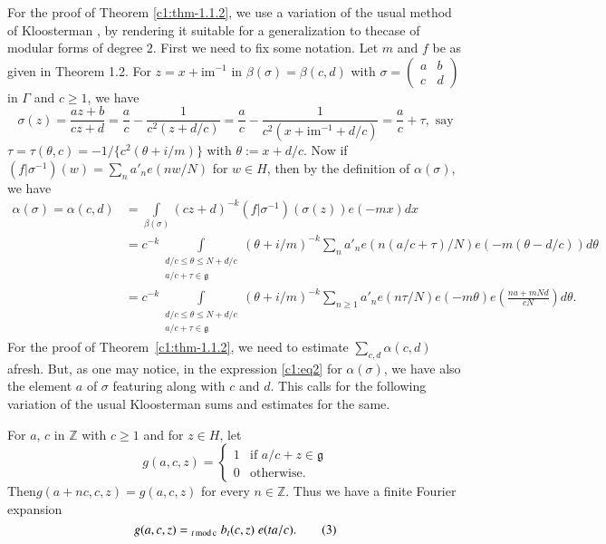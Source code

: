 For the proof of Theorem \ref{c1:thm-1.1.2}, we use a variation of the
usual method of Kloosterman \cite{key14}, by rendering it suitable for a
generalization to the\pageoriginale case of modular forms of degree
$2$. First we need to fix some notation. Let $m$ and $f$ be as given
in Theorem 1.2. For $z=x+\text{im}^{-1}$ in
$\beta(\sigma)=\beta(c,d)$ with $\sigma=\left(\begin{smallmatrix} a &
  b\\ c & d\end{smallmatrix}\right)$ in $\Gamma$ and $c\geq 1$, we
  have
$$
\sigma(z)=\frac{az+b}{cz+d}=\frac{a}{c}-\frac{1}{c^{2}(z+d/c)}=\frac{a}{c}-\frac{1}{c^{2}(x+\text{im}^{-1}+d/c)}=\frac{a}{c}+\tau,
\text{ \ say}
$$
$\tau=\tau(\theta,c)=-1/\{c^{2}(\theta+i/m)\}$ with
$\theta:=x+d/c$. Now if
$(f|\sigma^{-1})(w)=\sum\limits_{n}a'_{n}e(nw/N)$ for $w\in H$, then
by the definition of $\alpha(\sigma)$, we have
{\fontsize{9}{11}\selectfont
\begin{align*}
\alpha(\sigma)=\alpha(c,d) &=
\int\limits_{\beta(\sigma)}(cz+d)^{-k}(f|\sigma^{-1})(\sigma(z))e(-mx)dx\\
&= c^{-k}\int\limits_{\substack{d/c\leq \theta \leq
    N+d/c\\ a/c+\tau\in\mathfrak{g}}}(\theta+i/m)^{-k}\sum_{n}a'_{n}e(n(a/c+\tau)/N)e(-m(\theta-d/c))d\theta\\
&= c^{-k}\int\limits_{\substack{d/c\leq \theta\leq N+d/c\\ a/c+\tau\in
  \mathfrak{g}}}(\theta+i/m)^{-k}\sum_{n\geq 1}a'_{n}e(n\tau/N)e(-m\theta)e
\left(\frac{na+mNd}{cN}\right)d\theta.\tag{2}\label{c1:eq2}
\end{align*}}\relax
For the proof of Theorem~\ref{c1:thm-1.1.2}, we need to estimate
$\sum\limits_{c,d}\alpha(c,d)$ afresh. But, as one may notice, in the
expression \eqref{c1:eq2} for $\alpha(\sigma)$, we have also the element
$a$ of $\sigma$ featuring along with $c$ and $d$. This calls for the
following variation of the usual Kloosterman sums and estimates for
the same.

For $a$, $c$ in $\mathbb{Z}$ with $c\geq 1$ and for $z\in H$, let
$$
g(a,c,z)=
\begin{cases}
1 & \text{if \ } a/c+z\in\mathfrak{g}\\
0 & \text{otherwise.} 
\end{cases}
$$
Then\pageoriginale $g(a+nc,c,z)=g(a,c,z)$ for every
$n\in\mathbb{Z}$. Thus we have a finite Fourier expansion
\begin{equation*}
g(a,c,z)={}_{t \, \rm{mod} \,  c} \; b_{t}(c,z) \;
e(ta/c).\tag{3}\label{c1:eq3} 
\end{equation*}

